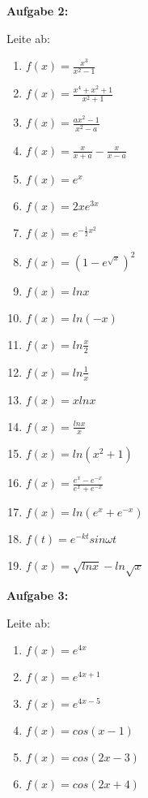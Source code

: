 \documentclass[a4paper,12pt]{article}
\newcommand{\Aufgabe}[1]{
  {
  \vspace*{0.5cm}
  \textsf{\textbf{Aufgabe #1}}
  \vspace*{0.2cm}
  
  }
}
\begin{document}
\Aufgabe{2:}
Leite ab:
\begin{enumerate}[label={\alph*)}, topsep=5pt,itemsep=4ex,partopsep=1ex,parsep=1ex]
  \item $f(x)=\frac{x^3}{x^2-1}$
  \item $f(x)=\frac{x^4+x^2+1}{x^2+1}$
  \item $f(x)=\frac{ax^2-1}{x^2-a}$
  \item $f(x)=\frac{x}{x+a}-\frac{x}{x-a}$
  \item $f(x)=e^x$
  \item $f(x)=2xe^{3x}$
  \item $f(x)=e^{-\frac{1}{2}x^2}$
  \item $f(x)=(1-e^{\sqrt{x}})^2$
  \item $f(x)=ln{x}$
  \item $f(x)=ln(-x)$
  \item $f(x)=ln{\frac{x}{2}}$
  \item $f(x)=ln{\frac{1}{x}}$
  \item $f(x)=x ln{x}$
  \item $f(x)=\frac{ln{x}}{x}$
  \item $f(x)=ln(x^2+1)$
  \item $f(x)=\frac{e^x-e^{-x}}{e^x+e^{-x}}$
  \item $f(x)=ln(e^x+e^{-x})$
  \item $f(t)=e^{-kt}sin{\omega t}$
  \item $f(x)=\sqrt{ln{x}}-ln{\sqrt{x}}$
\end{enumerate}

\newpage
\Aufgabe{3:}
Leite ab:
\begin{enumerate}[label={\alph*)}, topsep=5pt,itemsep=4ex,partopsep=1ex,parsep=1ex]
  \item $f(x)=e^{4x}$
  \item $f(x)=e^{4x+1}$
  \item $f(x)=e^{4x-5}$
  \item $f(x)=cos(x-1)$
  \item $f(x)=cos(2x-3)$
  \item $f(x)=cos(2x+4)$
\end{enumerate}
\end{document}
